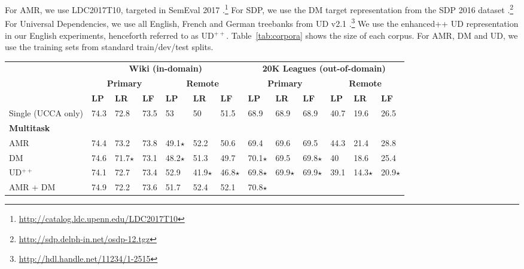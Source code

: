 \documentclass[11pt,a4paper]{article}
\begin{document}
For AMR, we use LDC2017T10, targeted in SemEval 2017
\cite{may2017semeval}.\footnote{\mbox{\url{http://catalog.ldc.upenn.edu/LDC2017T10}}}
For SDP, we use the DM target representation from the SDP 2016 dataset
\cite{oepen2016towards}.\footnote{\url{http://sdp.delph-in.net/osdp-12.tgz}}
For Universal Dependencies, we use all English, French and German treebanks from UD v2.1
\cite{11234/1-2515}.\footnote{\url{http://hdl.handle.net/11234/1-2515}}
We use the enhanced++ UD representation \cite{SCHUSTER16.779} in our English experiments,
henceforth referred to as UD$^{++}$.
Table~\ref{tab:corpora} shows the size of each corpus.
For AMR, DM and UD, we use the training sets from standard train/dev/test splits.

\begin{table*}
\centering
\small
\begin{tabular}{l|lll|lll||lll|lll}
& \multicolumn{6}{c||}{\footnotesize \bf Wiki (in-domain)}
& \multicolumn{6}{c}{\footnotesize \bf 20K Leagues (out-of-domain)} \\
& \multicolumn{3}{c|}{\footnotesize \bf Primary} & \multicolumn{3}{c||}{\footnotesize \bf Remote}
& \multicolumn{3}{c|}{\footnotesize \bf Primary} & \multicolumn{3}{c}{\footnotesize \bf Remote} \\
& \footnotesize \textbf{LP} & \footnotesize \textbf{LR} & \footnotesize \textbf{LF}
& \footnotesize \textbf{LP} & \footnotesize \textbf{LR} & \footnotesize \textbf{LF}
& \footnotesize \textbf{LP} & \footnotesize \textbf{LR} & \footnotesize \textbf{LF}
& \footnotesize \textbf{LP} & \footnotesize \textbf{LR} & \footnotesize \textbf{LF} \\
\hline
\small Single (UCCA only)
& 74.3 & 72.8 & 73.5 & 53 & 50 & 51.5 & 68.9 & 68.9 & 68.9 & 40.7 & 19.6 & 26.5 \\
\hline
\small \bf Multitask &&&&&&&&& \\
\small AMR
& 74.4 & 73.2 & 73.8 & 49.1$\star$ & 52.2 & 50.6
& 69.4 & 69.6 & 69.5 & 44.3 & 21.4 & 28.8 \\
\small DM
& 74.6 & 71.7$\star$ & 73.1 & 48.2$\star$ & 51.3 & 49.7
& 70.1$\star$ & 69.5 & 69.8$\star$ & 40 & 18.6 & 25.4 \\
\small UD$^{++}$
& 74.1 & 72.7 & 73.4 & 52.9 & 41.9$\star$ & 46.8$\star$
& 69.8$\star$ & 69.9$\star$ & 69.9$\star$ & 39.1 & 14.3$\star$ & 20.9$\star$ \\
\small AMR + DM
& 74.9 & 72.2 & 73.6 & 51.7 & 52.4 & 52.1 & 70.8$\star$

\end{tabular}
\end{table*}
\end{document}
